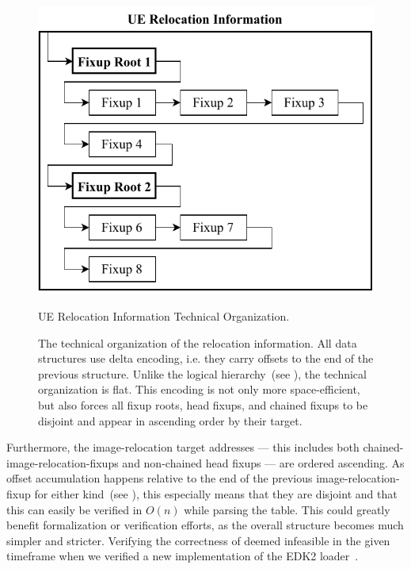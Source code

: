 \begin{figure}[htb]
  \centering
  \includegraphics{Figures/UeRelocLinking.pdf}
  \caption{UE Relocation Information Technical Organization.}
  \label{fig:ue_reloc_org}
  \caption*{The technical organization of the  relocation information. All data structures use delta encoding, i.e. they carry offsets to the end of the previous structure. Unlike the logical hierarchy~(see ), the technical organization is flat. This encoding is not only more space-efficient, but also forces all fixup roots, head fixups, and chained fixups to be disjoint and appear in ascending order by their target.}
\end{figure}

Furthermore, the \gls{image-relocation} target addresses --- this includes both \gls{chained-image-relocation-fixups} and non-chained head fixups --- are ordered ascending. As offset accumulation happens relative to the end of the previous \gls{image-relocation-fixup} for either kind~(see ), this especially means that they are disjoint and that this can easily be verified in $O(n)$ while parsing the table. This could greatly benefit formalization or verification efforts, as the overall structure becomes much simpler and stricter. Verifying the correctness of deemed infeasible in the given timeframe when we verified a new implementation of the \gls{EDK2}  loader~\cite{secure-pe}.


